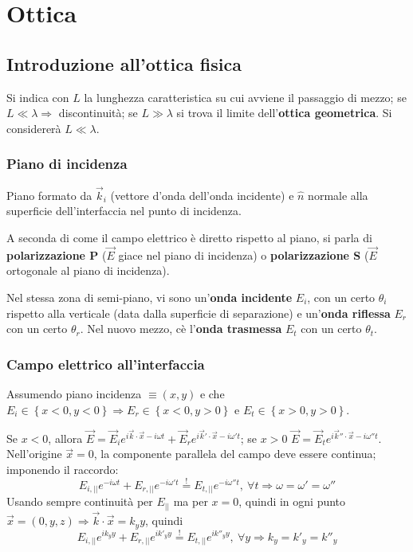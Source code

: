 \documentclass[10pt, a4paper]{scrartcl}
\numberwithin{equation}{subsection}
\theoremstyle{style1}
\begin{document}
\section{Ottica}
\subsection{Introduzione all'ottica fisica}

Si indica con $L$ la lunghezza caratteristica su cui avviene il passaggio di mezzo; se $L\ll \lambda \Rightarrow $ discontinuit\`a; se $L\gg\lambda $ si trova il limite dell'\textbf{ottica geometrica}. Si considerer\`a $L \ll \lambda $.

\subsubsection{Piano di incidenza}
Piano formato da $\vec{k}_i$ (vettore d'onda dell'onda incidente) e $\hat{n}$ normale alla superficie dell'interfaccia nel punto di incidenza.

A seconda di come il campo elettrico \`e diretto rispetto al piano, si parla di \textbf{polarizzazione P} ($\vec{E}$ giace nel piano di incidenza) o \textbf{polarizzazione S} ($\vec{E}$ ortogonale al piano di incidenza).

Nel stessa zona di semi-piano, vi sono un'\textbf{onda incidente} $E_i$, con un certo $\theta _i$ rispetto alla verticale (data dalla superficie di separazione) e un'\textbf{onda riflessa} $E_r$ con un certo $\theta _r$. Nel nuovo mezzo, c\`e l'\textbf{onda trasmessa} $E_t$ con un certo $\theta _t$. 

\subsubsection{Campo elettrico all'interfaccia}

Assumendo piano incidenza $\equiv (x,y)$ e che $E_i \in \left\{ x<0,y<0 \right\} \Rightarrow E_r \in \left\{ x<0,y>0 \right\} $ e $E_t \in \left\{ x>0, y>0 \right\} $.


Se $x<0$, allora $\vec{E}= \vec{E}_i e^{i \vec{k}\cdot \vec{x}-i\omega t} + \vec{E}_r e^{i \vec{k}'\cdot \vec{x}- i \omega' t} $; se $x>0$ $\vec{E}= \vec{E}_t e^{i \vec{k}'' \cdot \vec{x}-i\omega '' t} $. Nell'origine $\vec{x}=0$, la componente parallela del campo deve essere continua; imponendo il raccordo:
\begin{equation}
	E_{i, | |} e^{-i\omega t} + E_{r, | |} e^{-i\omega ' t} \stackrel{!}{=} E_{t, | |} e^{-i\omega '' t}, \ \forall  t \Rightarrow \omega=  \omega  ' = \omega''     
\end{equation}
Usando sempre continuit\`a per $E_{| |} $ ma per $x=0$, quindi in ogni punto $\vec{x} = (0,y,z) \Rightarrow \vec{k}\cdot \vec{x}= k_y y$, quindi
\begin{equation}
	E_{i, | |} e^{ik_y y } + E_{r, | |} e^{i k'_y y} \stackrel{!}{=} E_{t, | |} e^{i k''_y y}, \ \forall y\Rightarrow k_y = k'_y = k''_y      
\end{equation}
\end{document}
